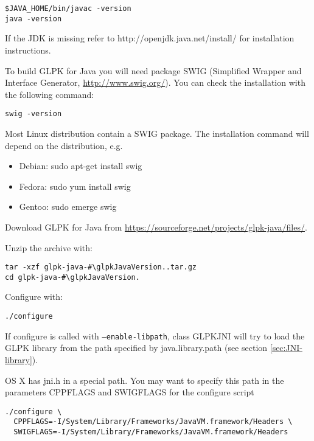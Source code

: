 \documentclass[a4paper,11pt]{report}
\newcommand{\glpkJavaVersion}{1.10.0}
\newcommand{\code}{\texttt}
\begin{document}
\begin{lstlisting}
$JAVA_HOME/bin/javac -version
java -version
\end{lstlisting}

If the JDK is missing refer to http://openjdk.java.net/install/ for
installation instructions.

To build GLPK for Java you will need package SWIG (Simplified Wrapper and
Interface Generator, \href{http://www.swig.org/}{http://www.swig.org/}). You
can check the installation with the following command:

\begin{lstlisting}
swig -version
\end{lstlisting}

Most Linux distribution contain a SWIG package. The installation command will
depend on the distribution, e.g.

\begin{itemize}
\item Debian: sudo apt-get install swig
\item Fedora: sudo yum install swig
\item Gentoo: sudo emerge swig
\end{itemize}

Download GLPK for Java from \href{https://sourceforge.net/projects/glpk-java/files/}{https://sourceforge.net/projects/glpk-java/files/}.

Unzip the archive with:

\begin{lstlisting}
tar -xzf glpk-java-#\glpkJavaVersion..tar.gz
cd glpk-java-#\glpkJavaVersion.
\end{lstlisting}

Configure with:
\begin{lstlisting}
./configure
\end{lstlisting}

If configure is called with \code{--enable-libpath},
class GLPKJNI will try to load the GLPK library from the path specified by
java.library.path (see section \ref{sec:JNI-library}).

OS X has jni.h in a special path. You may want to specify this path in the
parameters CPPFLAGS and SWIGFLAGS for the configure script

\begin{lstlisting}
./configure \
  CPPFLAGS=-I/System/Library/Frameworks/JavaVM.framework/Headers \
  SWIGFLAGS=-I/System/Library/Frameworks/JavaVM.framework/Headers
\end{lstlisting}
\end{document}
